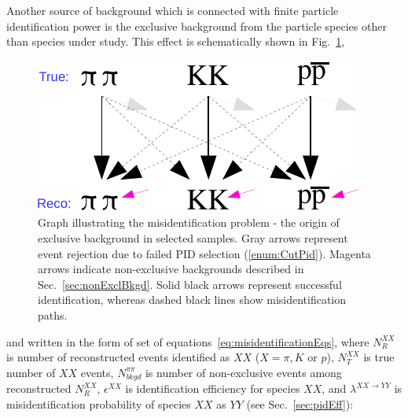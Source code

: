 Another source of background which is connected with finite particle identification power is the exclusive background from the particle species other than species under study. This effect is schematically shown in Fig.~\ref{fig:misidentificationGraph}, %
\begin{figure}[h!]\vspace{5pt}
\centering%
\parbox{0.4725\textwidth}{%
  \centering%
  \includegraphics[width=\linewidth]{graphics/backgrounds/pid-crop2.pdf}
}%
\quad%
\parbox{0.4725\textwidth}{%
    \caption[Graph illustrating the misidentification problem.]{Graph illustrating the misidentification problem - the origin of exclusive background in selected samples. Gray arrows represent event rejection due to failed PID selection (\ref{enum:CutPid}). Magenta arrows indicate non-exclusive backgrounds described in Sec.~\ref{sec:nonExclBkgd}. Solid black arrows represent successful identification, whereas dashed black lines show misidentification paths.}\label{fig:misidentificationGraph}
}%
\vspace{5pt}
\end{figure}
and written in the form of set of equations~\eqref{eq:misidentificationEqs}, where $N^{XX}_{R}$ is number of reconstructed events identified as $XX$ ($X=\pi, K \text{~or~} p$), $N^{XX}_{T}$ is true number of $XX$ events, $N^{\pi\pi}_{bkgd}$ is number of non-exclusive events among reconstructed $N^{XX}_{R}$, $\epsilon^{XX}$ is identification efficiency for species $XX$, and $\lambda^{XX\rightarrow YY}$ is misidentification probability of species $XX$ as $YY$ (see Sec.~\ref{sec:pidEff}):
